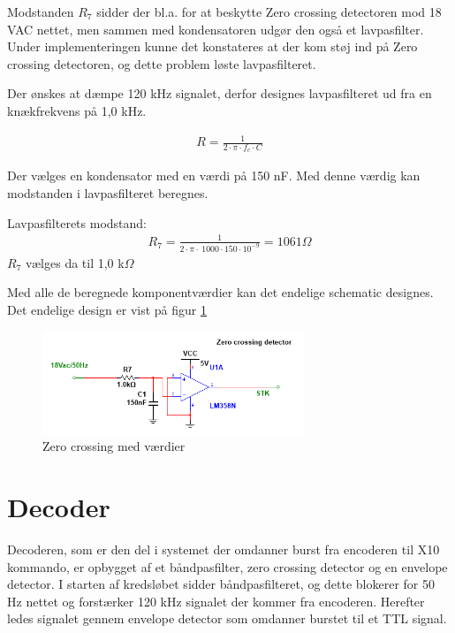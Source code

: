 Modstanden $R_7$ sidder der bl.a. for at beskytte Zero crossing detectoren mod 18 VAC nettet, men sammen med kondensatoren udgør den også et lavpasfilter. Under implementeringen kunne det konstateres at der kom støj ind på Zero crossing detectoren, og dette problem løste lavpasfilteret. 

Der ønskes at dæmpe 120 kHz signalet, derfor designes lavpasfilteret ud fra en knækfrekvens på 1,0 kHz. 

\begin{align}
R = \frac{1}{2 \cdot \pi \cdot f_c \cdot C } 
\end{align}

Der vælges en kondensator med en værdi på 150 nF. Med denne værdig kan modstanden i lavpasfilteret beregnes. 

Lavpasfilterets modstand:
\begin{align}
R_7 = \frac{1}{2 \cdot \pi \cdot \ 1000 \cdot 150 \cdot 10^{-9}} = 1061 \Omega
\end{align}
$R_7$ vælges da til 1,0 k$\Omega$

Med alle de beregnede komponentværdier kan det endelige schematic designes. Det endelige design er vist på figur \ref{fig:ZC_MV} 

\begin{figure}[htbp]
	\centering
	\includegraphics[width=0.70\textwidth]{billeder/HWdesign/ZC_MV}
	\caption{Zero crossing med værdier}
	\label{fig:ZC_MV}
\end{figure}

\newpage

\section{Decoder}
Decoderen, som er den del i systemet der omdanner burst fra encoderen til X10 kommando, er opbygget af et båndpasfilter, zero crossing detector og en envelope detector. I starten af kredsløbet sidder båndpasfilteret, og dette blokerer for 50 Hz nettet og forstærker 120 kHz signalet der kommer fra encoderen. Herefter ledes signalet gennem envelope detector som omdanner burstet til et TTL signal.

